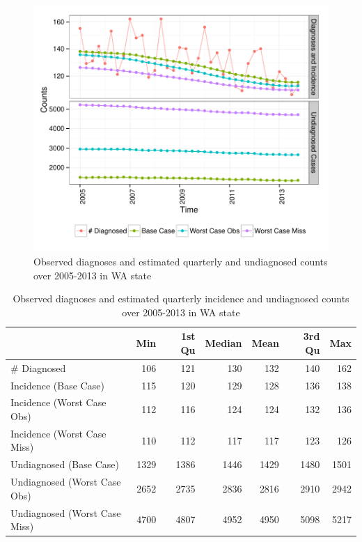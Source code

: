 \documentclass{article}\usepackage[]{graphicx}\usepackage[]{color}
\makeatletter
\def\maxwidth{ %
  \ifdim\Gin@nat@width>\linewidth
    \linewidth
  \else
    \Gin@nat@width
  \fi
}
\newenvironment{knitrout}{}{} %
\makeatother
\begin{document}
\begin{knitrout}\footnotesize
{}\color{fgcolor}\begin{figure}[!h]


{\centering \includegraphics[width=\maxwidth]{figure/minimal-results_plot} 

}

\caption[Observed diagnoses and estimated quarterly and undiagnosed counts over 2005-2013 in WA state]{Observed diagnoses and estimated quarterly and undiagnosed counts over 2005-2013 in WA state\label{fig:results_plot}}
\end{figure}


\end{knitrout}


\begin{table}[ht]
\centering
\caption{Observed diagnoses and estimated quarterly incidence and undiagnosed counts over 2005-2013 in WA state} 
\label{tab:res_main}
{\small
\begin{tabular}{lrrrrrr}
  \hline
 & Min  & 1st Qu  & Median & Mean & 3rd Qu  & Max  \\ 
  \hline
\# Diagnosed & 106 & 121 & 130 & 132 & 140 & 162 \\ 
  Incidence (Base Case) & 115 & 120 & 129 & 128 & 136 & 138 \\ 
  Incidence (Worst Case Obs) & 112 & 116 & 124 & 124 & 132 & 136 \\ 
  Incidence (Worst Case Miss) & 110 & 112 & 117 & 117 & 123 & 126 \\ 
  Undiagnosed (Base Case) & 1329 & 1386 & 1446 & 1429 & 1480 & 1501 \\ 
  Undiagnosed (Worst Case Obs) & 2652 & 2735 & 2836 & 2816 & 2910 & 2942 \\ 
  Undiagnosed (Worst Case Miss) & 4700 & 4807 & 4952 & 4950 & 5098 & 5217 \\ 
   \hline
\end{tabular}
}
\end{table}
\end{document}
